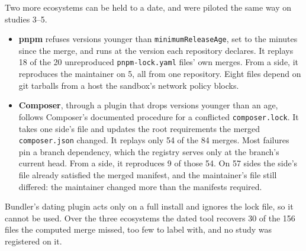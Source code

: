 \documentclass[11pt]{article}
\newcommand{\code}[1]{\texttt{#1}}
\begin{document}
Two more ecosystems can be held to a date, and were piloted the same way on studies 3--5.
\begin{itemize}
  \item \textbf{pnpm} refuses versions younger than \code{minimumReleaseAge}, set to the minutes
  since the merge, and runs at the version each repository declares. It replays 18 of the 20
  unreproduced \code{pnpm-lock.yaml} files' own merges. From a side, it reproduces the
  maintainer on 5, all from one repository. Eight files depend on git tarballs from a host the
  sandbox's network policy blocks.
  \item \textbf{Composer}, through a plugin that drops versions younger than an age, follows
  Composer's documented procedure for a conflicted \code{composer.lock}. It takes one side's file
  and updates the root requirements the merged \code{composer.json} changed. It replays only 54
  of the 84 merges. Most failures pin a branch dependency, which the registry serves only at the
  branch's current head. From a side, it reproduces 9 of those 54. On 57 sides the side's file
  already satisfied the merged manifest, and the maintainer's file still differed: the
  maintainer changed more than the manifests required.
\end{itemize}
Bundler's dating plugin acts only on a full install and ignores the lock file, so it cannot be
used. Over the three ecosystems the dated tool recovers 30 of the 156 files the computed merge
missed, too few to label with, and no study was registered on it.
\end{document}
